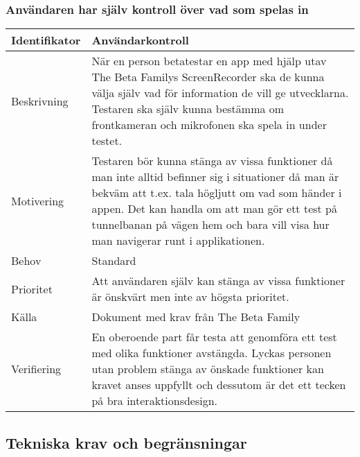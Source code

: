 \subsubsection{Användaren har själv kontroll över vad som spelas in}
\begin{tabular}{ | p{65pt} | p{300pt} |}
  \hline
  Identifikator &
  Användarkontroll
  \\ \hline
  Beskrivning & 
  När en person betatestar en app med hjälp utav The Beta Familys ScreenRecorder ska de kunna välja själv vad för information de vill ge utvecklarna. Testaren ska själv kunna bestämma om frontkameran och mikrofonen ska spela in under testet. 
  \\ \hline
  Motivering &
  Testaren bör kunna stänga av vissa funktioner då man inte alltid befinner sig i situationer då man är bekväm att t.ex. tala högljutt om vad som händer i appen. Det kan handla om att man gör ett test på tunnelbanan på vägen hem och bara vill visa hur man navigerar runt i applikationen.
  \\ \hline
  Behov &
  Standard
  \\ \hline
  Prioritet &
  Att användaren själv kan stänga av vissa funktioner är önskvärt men inte av högsta prioritet.
  \\ \hline
  Källa &
  Dokument med krav från The Beta Family
  \\ \hline
  Verifiering &
  En oberoende part får testa att genomföra ett test med olika funktioner avstängda. Lyckas personen utan problem stänga av önskade funktioner kan kravet anses uppfyllt och dessutom är det ett tecken på bra interaktionsdesign.
  \\ \hline
\end{tabular}

\subsection{Tekniska krav och begränsningar}
